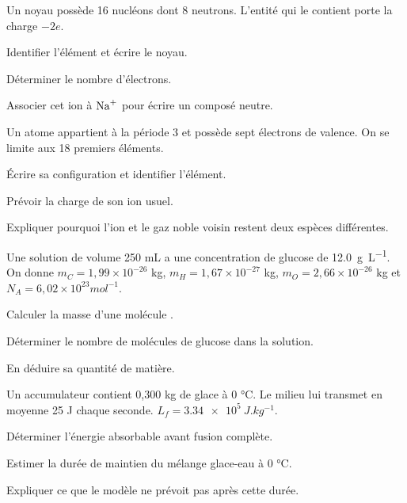 \label{defi-ex-4-1}
Un noyau possède 16 nucléons dont 8 neutrons. L’entité qui le contient porte la charge $-2e$.
\begin{questions}
\item Identifier l’élément et écrire le noyau.
\item Déterminer le nombre d’électrons.
\item Associer cet ion à $\ce{Na+}$ pour écrire un composé neutre.
\end{questions}
\smallskip{}\hfill{}

\label{defi-ex-5-1}
Un atome appartient à la période 3 et possède sept électrons de valence. On se limite aux 18 premiers éléments.
\begin{questions}
\item Écrire sa configuration et identifier l’élément.
\item Prévoir la charge de son ion usuel.
\item Expliquer pourquoi l’ion et le gaz noble voisin restent deux espèces différentes.
\end{questions}
\smallskip{}\hfill{}

\label{defi-ex-6-1}
Une solution de volume 250 mL a une concentration de glucose de \qty{12,0}{g.L^{-1}}. On donne $m_C=1,99\times10^{-26}$ kg, $m_H=1,67\times10^{-27}$ kg, $m_O=2,66\times10^{-26}$ kg et $N_A=6,02\times10^{23}\unit{mol^{-1}}$.
\begin{questions}
\item Calculer la masse d’une molécule .
\item Déterminer le nombre de molécules de glucose dans la solution.
\item En déduire sa quantité de matière.
\end{questions}
\smallskip{}\hfill{}

\label{defi-ex-7-1}
Un accumulateur contient 0,300 kg de glace à 0 °C. Le milieu lui transmet en moyenne 25 J chaque seconde. $L_f=\qty{3,34e5}{J.kg^{-1}}$.
\begin{questions}
\item Déterminer l’énergie absorbable avant fusion complète.
\item Estimer la durée de maintien du mélange glace-eau à 0 °C.
\item Expliquer ce que le modèle ne prévoit pas après cette durée.
\end{questions}
\smallskip{}\hfill{}

